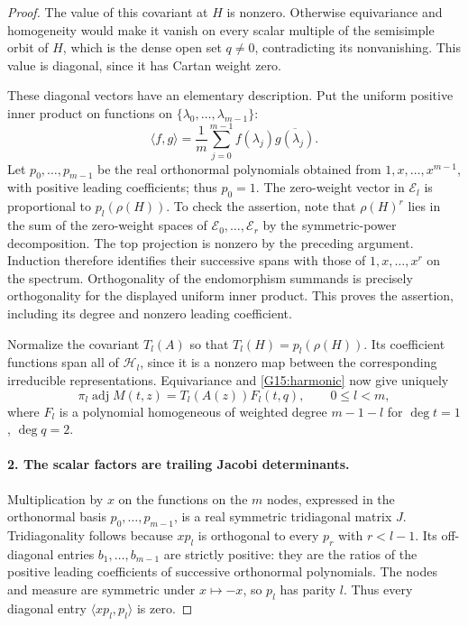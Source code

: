 \documentclass[11pt,a4paper]{article}
\theoremstyle{definition}\newtheorem{definition}{Definition}
\begin{document}
\begin{proof}
The value of this covariant at $H$ is nonzero. Otherwise
equivariance and homogeneity would make it vanish on
every scalar multiple of the semisimple orbit of $H$,
which is the dense open set $q\ne0$, contradicting its
nonvanishing. This value is diagonal, since it has
Cartan weight zero.

These diagonal vectors have an elementary description.
Put the uniform positive inner product on functions on
$\{\lambda_0,\ldots,\lambda_{m-1}\}$:
\[
 \langle f,g\rangle=\frac1m\sum_{j=0}^{m-1}
                          f(\lambda_j)\overline{g(\lambda_j)}.
\]
Let $p_0,\ldots,p_{m-1}$ be the real orthonormal
polynomials obtained from $1,x,\ldots,x^{m-1}$, with
positive leading coefficients; thus $p_0=1$.
The zero-weight vector in $\mathcal E_l$ is proportional
to $p_l(\rho(H))$. To check the assertion, note that
$\rho(H)^r$ lies in the sum of the zero-weight spaces of
$\mathcal E_0,\ldots,\mathcal E_r$ by the symmetric-power
decomposition. The top projection is nonzero by the
preceding argument. Induction therefore identifies their
successive spans with those of $1,x,\ldots,x^r$ on the
spectrum. Orthogonality of the endomorphism summands
is precisely orthogonality for the displayed uniform
inner product. This proves the assertion, including
its degree and nonzero leading coefficient.

Normalize the covariant $T_l(A)$ so that
$T_l(H)=p_l(\rho(H))$. Its coefficient functions span
all of $\mathcal H_l$, since it is a nonzero map between
the corresponding irreducible representations.
Equivariance and \eqref{G15:harmonic} now give uniquely
\begin{equation}\label{G15:adjexpansion}
 \pi_l\operatorname{adj} M(t,z)=T_l(A(z))F_l(t,q),
 \qquad 0\leq l<m,
\end{equation}
where $F_l$ is a polynomial homogeneous of weighted
degree $m-1-l$ for $\deg t=1$, $\deg q=2$.

\paragraph{2. The scalar factors are trailing Jacobi determinants.}
Multiplication by $x$ on the functions on the $m$ nodes,
expressed in the orthonormal basis $p_0,\ldots,p_{m-1}$,
is a real symmetric tridiagonal matrix $J$.
Tridiagonality follows because $xp_l$ is orthogonal
to every $p_r$ with $r<l-1$. Its off-diagonal entries
$b_1,\ldots,b_{m-1}$ are strictly positive: they are
the ratios of the positive leading coefficients of
successive orthonormal polynomials. The nodes and
measure are symmetric under $x\mapsto-x$, so $p_l$
has parity $l$. Thus every diagonal entry
$\langle xp_l,p_l\rangle$ is zero.


\end{proof}
\end{document}
